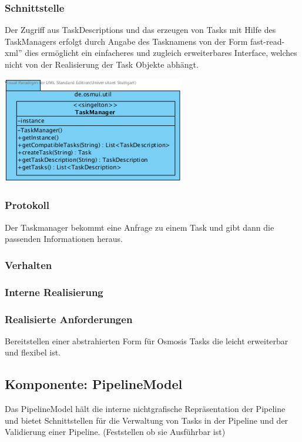 \documentclass[a4paper,12pt]{scrartcl}
\begin{document}
\subsubsection{Schnittstelle}
Der Zugriff aus TaskDescriptions und das erzeugen von Tasks mit Hilfe des TaskManagers erfolgt durch Angabe des Tasknamens
von der Form \glqq fast-read-xml'' dies ermöglicht ein einfacheres und zugleich erweiterbares Interface, welches nicht von der Realisierung der Task Objekte abhängt.
\begin{center}
\includegraphics[width=8cm]{Schnittstelle_TaskManager.png}
\end{center}
\subsubsection{Protokoll}
Der Taskmanager bekommt eine Anfrage zu einem Task und gibt dann die passenden Informationen heraus.
\subsubsection{Verhalten}
\subsubsection{Interne Realisierung}
\subsubsection{Realisierte Anforderungen}
Bereitstellen einer abstrahierten Form für Osmosis Tasks die leicht erweiterbar und flexibel ist.

\newpage
\subsection{Komponente: PipelineModel}
Das PipelineModel hält die interne nichtgrafische Repräsentation der Pipeline und bietet Schnittstellen für die Verwaltung von Tasks in der Pipeline und der Validierung einer Pipeline. (Feststellen ob sie Ausführbar ist)
\end{document}
